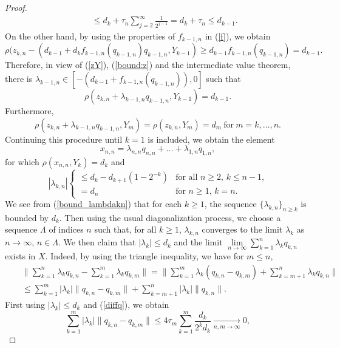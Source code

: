 \documentclass[10pt,a4paper]{amsart}
\begin{document}
\begin{proof}
\begin{eqnarray}
&&\le d_k+\tau_n\sum_{j=2}^\infty\frac{1}{2^{j-1}}= d_k+\tau_n\le d_{k-1}.
\end{eqnarray}
On the other hand, by using the properties of $f_{k-1,n}$ in (\ref{f}), we obtain
\begin{equation}
\label{bound:z}
\rho(z_{k,n}-(d_{k-1}+d_kf_{k-1,n}(q_{k-1,n})q_{k-1,n},Y_{k-1})\ge d_{k-1}f_{k-1,n}(q_{k-1,n})= d_{k-1}.
\end{equation}
Therefore, in view of (\ref{zY}), (\ref{bound:z}) and the intermediate value theorem, there is $\lambda_{k-1,n}\in [-(d_{k-1}+f_{k-1,n}(q_{k-1,n})),0]$ such that
$$
\rho(z_{k,n}+\lambda_{k-1,n}q_{k-1,n},Y_{k-1})=d_{k-1}.
$$
Furthermore,
$$
\rho(z_{k,n}+\lambda_{k-1,n}q_{k-1,n},Y_{m})=\rho(z_{k,n},Y_m)=d_{m}~\mbox{for}~m=k,\ldots,n.
$$
Continuing this procedure until $k=1$ is included, we obtain the element
$$
x_{n,n}=\lambda_{n,n}q_{n,n}+\ldots+\lambda_{1,n}q_{1,n},
$$
for which $\rho(x_{n,n},Y_k)=d_k$ and
\begin{equation}
\label{bound_lambdakn}
|\lambda_{k,n}|\left\{
\begin{array}{ll}
\le d_k-d_{k+1}(1-2^{-k})& \mbox{for all $n\ge2$, $k\le n-1$,}\\
=d_n&\mbox{for $n\ge1$, $k=n$.}
\end{array}\right.
 \end{equation}
We see from (\ref{bound_lambdakn}) that for each $k\ge1$, the sequence $\{\lambda_{k,n}\}_{n\ge k}$ is bounded by $d_k$. Then using the usual diagonalization process, we choose a sequence $\Lambda$ of indices $n$ such that, for all $k\ge1$, $\lambda_{k,n}$ converges to the limit $\lambda_k$ as $n\rightarrow\infty$, $n\in\Lambda$. We then claim that $|\lambda_k|\le d_k$ and the limit $\lim\limits_{n\rightarrow\infty}\sum\limits_{k=1}^n\lambda_kq_{k,n}$ exists in $X$. Indeed, by using the triangle inequality, we have for $m\le n$,
\begin{eqnarray}
\label{dfflambdaq}
&&\Big\|\sum_{k=1}^n\lambda_{k}q_{k,n}-\sum_{k=1}^m\lambda_{k}q_{k,m}\Big\|=\Big\|\sum_{k=1}^m\lambda_{k}(q_{k,n}-q_{k,m})+\sum_{k={m+1}}^n\lambda_{k}q_{k,n}\Big\|\nonumber\\
&&\le \sum_{k=1}^m|\lambda_{k}|\|q_{k,n}-q_{k,m}\|+\sum_{k={m+1}}^n|\lambda_{k}|\|q_{k,n}\|.
\end{eqnarray}
First using $|\lambda_k|\le d_k$ and (\ref{diffq}), we obtain
\begin{equation}
\label{dfflambdaq1}
\sum_{k=1}^m|\lambda_{k}|\|q_{k,n}-q_{k,m}\|\le 4\tau_m\sum_{k=1}^m\frac{d_k}{2^kd_k}\xrightarrow[n,m\rightarrow\infty]{}0,

\end{equation}
\end{proof}
\end{document}
